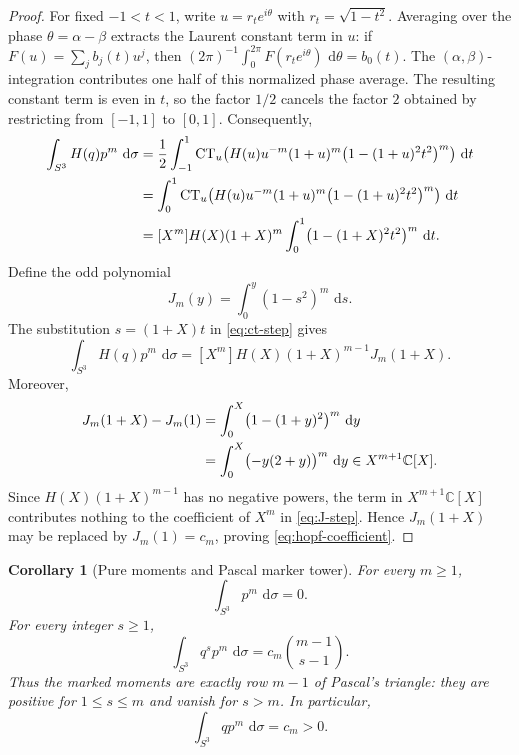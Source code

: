 \documentclass[11pt]{article}
\numberwithin{equation}{section}
\newtheorem{corollary}[theorem]{Corollary}
\newcommand{\C}{\mathbb C}
\newcommand{\CT}{\operatorname{CT}}
\newcommand{\dd}{\,\mathrm d}
\begin{document}
\begin{proof}
For fixed $-1<t<1$, write $u=r_t e^{i\theta}$ with
$r_t=\sqrt{1-t^2}$.  Averaging over the phase
$\theta=\alpha-\beta$ extracts the Laurent constant term in $u$: if
$F(u)=\sum_j b_j(t)u^j$, then
$(2\pi)^{-1}\int_0^{2\pi}F(r_t e^{i\theta})\,\dd\theta=b_0(t)$.
The $(\alpha,\beta)$-integration contributes one half of this normalized phase
average.  The resulting constant term is even in $t$, so the factor $1/2$
cancels the factor $2$ obtained by restricting from $[-1,1]$ to $[0,1]$.
Consequently,
\begin{align}
 \int_{S^3}H(q)p^m\,\dd\sigma
 &=\frac12\int_{-1}^1\CT_u\!\left(
 H(u)u^{-m}(1+u)^m
 \bigl(1-(1+u)^2t^2\bigr)^m\right)\dd t\notag\\
 &=\int_0^1\CT_u\!\left(
 H(u)u^{-m}(1+u)^m
 \bigl(1-(1+u)^2t^2\bigr)^m\right)\dd t\notag\\
 &=[X^m]H(X)(1+X)^m
 \int_0^1\bigl(1-(1+X)^2t^2\bigr)^m\,\dd t.
 \label{eq:ct-step}
\end{align}
Define the odd polynomial
\[
 J_m(y)=\int_0^y(1-s^2)^m\,\dd s.
\]
The substitution $s=(1+X)t$ in \eqref{eq:ct-step} gives
\begin{equation}\label{eq:J-step}
 \int_{S^3}H(q)p^m\,\dd\sigma
 =[X^m]H(X)(1+X)^{m-1}J_m(1+X).
\end{equation}
Moreover,
\begin{align}
 J_m(1+X)-J_m(1)
 &=\int_0^X\bigl(1-(1+y)^2\bigr)^m\,\dd y\notag\\
 &=\int_0^X\bigl(-y(2+y)\bigr)^m\,\dd y
 \in X^{m+1}\C[X].
 \label{eq:J-congruence}
\end{align}
Since $H(X)(1+X)^{m-1}$ has no negative powers, the term in
$X^{m+1}\C[X]$ contributes nothing to the coefficient of $X^m$ in
\eqref{eq:J-step}.  Hence $J_m(1+X)$ may be replaced by
$J_m(1)=c_m$, proving \eqref{eq:hopf-coefficient}.
\end{proof}

\begin{corollary}[Pure moments and Pascal marker tower]
\label{cor:sphere-marker-tower}
For every $m\geq1$,
\begin{equation}\label{eq:sphere-pure}
 \int_{S^3}p^m\,\dd\sigma=0.
\end{equation}
For every integer $s\geq1$,
\begin{equation}\label{eq:sphere-marked}
 \int_{S^3}q^sp^m\,\dd\sigma
 =c_m\binom{m-1}{s-1}.
\end{equation}
Thus the marked moments are exactly row $m-1$ of Pascal's triangle: they are
positive for $1\leq s\leq m$ and vanish for $s>m$.  In particular,
\begin{equation}\label{eq:sphere-first-marker}
 \int_{S^3}qp^m\,\dd\sigma=c_m>0.
\end{equation}
\end{corollary}
\end{document}
